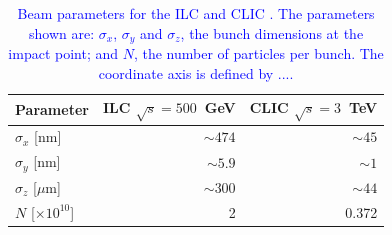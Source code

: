 \begin{table}[h!]
\centering
\begin{tabular}{ l r r }
\hline
Parameter & ILC $\sqrt{s} = 500$~GeV & CLIC $\sqrt{s} = 3$~TeV \\
\hline
$\sigma_{x}$ [nm] & $\sim 474$ & $\sim 45$ \\
$\sigma_{y}$ [nm] & $\sim 5.9$ & $\sim 1$ \\
$\sigma_{z}$ [$\mu$m]& $\sim 300$ & $\sim 44$ \\
$N$ [$\times 10^{10}$] & 2 & 0.372 \\
\hline
\end{tabular}
\caption[Beam parameters for the ILC \cite{Behnke:2013xla} and CLIC \cite{Linssen:2012hp}.  The parameters shown are: $\sigma_{x}$, $\sigma_{y}$ and $\sigma_{z}$, the bunch dimensions at the impact point; and $N$, the number of particles per bunch.  The coordinate axis is defined by ....]{\textcolor{blue}{Beam parameters for the ILC \cite{Behnke:2013xla} and CLIC \cite{Linssen:2012hp}.  The parameters shown are: $\sigma_{x}$, $\sigma_{y}$ and $\sigma_{z}$, the bunch dimensions at the impact point; and $N$, the number of particles per bunch.  The coordinate axis is defined by ....}}
\label{table:clicbeam}
\end{table}


